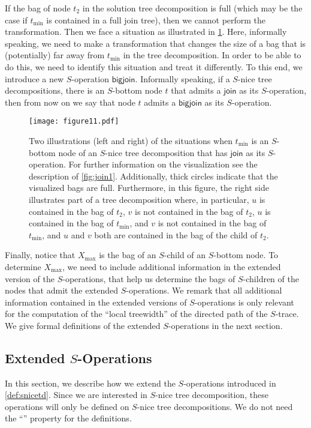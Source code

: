 \documentclass[a4paper,UKenglish,cleveref, autoref, thm-restate, numberwithinsect]{lipics-v2021}
\newcommand{\join}{\mathsf{join}}
\newcommand{\bigjoin}{\mathsf{bigjoin}}
\newcommand{\slim}{\text{slim}\xspace}
\newcommand{\topheavy}{\text{top-heavy}\xspace}
\begin{document}
If the bag of node $t_2$ in the solution tree decomposition is full (which may be the case if $t_{\min}$ is contained in a full join tree), then we cannot perform the transformation. Then we face a situation as illustrated in \cref{fig:join2}. Here, informally speaking, we need to make a transformation that changes the size of a bag that is (potentially) far away from $t_{\min}$ in the tree decomposition. In order to be able to do this, we need to identify this situation and treat it differently. 
To this end, we introduce a new $S$-operation $\bigjoin$. Informally speaking, if a \slim \topheavy $S$-nice tree decompositions, there is an $S$-bottom node $t$ that admits a $\join$ as its $S$-operation, then from now on we say that node $t$ admits a $\bigjoin$ as its $S$-operation. 


\begin{figure}[t]
\centering
\texttt{[image: figure11.pdf]}
    \caption{Two illustrations (left and right) of the situations when $t_{\min}$ is an $S$-bottom node of an $S$-nice tree decomposition that has $\join$ as its $S$-operation. For further information on the visualization see the description of \cref{fig:join1}. Additionally, thick circles indicate that the visualized bags are full. Furthermore, in this figure, the right side illustrates part of a tree decomposition where, in particular, $u$ is contained in the bag of $t_2$, $v$ is not contained in the bag of $t_2$, $u$ is contained in the bag of $t_{\min}$, and $v$ is not contained in the bag of~$t_{\min}$, and $u$ and $v$ both are contained in the bag of the child of $t_2$.}\label{fig:join2}
\end{figure}


Finally, notice that $X_{\max}$ is the bag of an $S$-child of an $S$-bottom node. To determine $X_{\max}$, we need to include additional information in the extended version of the $S$-operations, that help us determine the bags of $S$-children of the nodes that admit the extended $S$-operations.
We remark that all additional information contained in the extended versions of $S$-operations is only relevant for the computation of the ``local treewidth'' of the directed path of the $S$-trace.
We give formal definitions of the extended $S$-operations in the next section.

\subsection{Extended \boldmath$S$-Operations}\label{sec:extendedops}
In this section, we describe how we extend the $S$-operations introduced in \cref{def:snicetd}. 
Since we are interested in \slim $S$-nice tree decomposition, these operations will only be defined on \slim $S$-nice tree decompositions. We do not need the ``\topheavy'' property for the definitions.
\end{document}

